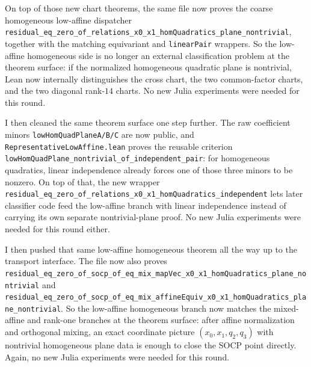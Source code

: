 \documentclass[11pt]{article}
\begin{document}
On top of those new chart theorems, the same file now proves the coarse
homogeneous low-affine dispatcher
\texttt{residual\_eq\_zero\_of\_relations\_x0\_x1\_homQuadratics\_plane\_nontrivial},
together with the matching equivariant and \texttt{linearPair} wrappers. So the
low-affine homogeneous side is no longer an external classification problem at
the theorem surface: if the normalized homogeneous quadratic plane is nontrivial,
Lean now internally distinguishes the cross chart, the two common-factor
charts, and the two diagonal rank-\(14\) charts. No new Julia experiments were
needed for this round.

I then cleaned the same theorem surface one step further. The raw coefficient
minors \texttt{lowHomQuadPlaneA/B/C} are now public, and
\texttt{RepresentativeLowAffine.lean} proves the reusable criterion
\texttt{lowHomQuadPlane\_nontrivial\_of\_independent\_pair}: for homogeneous
quadratics, linear independence already forces one of those three minors to be
nonzero. On top of that, the new wrapper
\texttt{residual\_eq\_zero\_of\_relations\_x0\_x1\_homQuadratics\_independent}
lets later classifier code feed the low-affine branch with linear independence
instead of carrying its own separate nontrivial-plane proof. No new Julia
experiments were needed for this round either.

I then pushed that same low-affine homogeneous theorem all the way up to the
transport interface. The file now also proves
\texttt{residual\_eq\_zero\_of\_socp\_of\_eq\_mix\_mapVec\_x0\_x1\_homQuadratics\_plane\_nontrivial}
and
\texttt{residual\_eq\_zero\_of\_socp\_of\_eq\_mix\_affineEquiv\_x0\_x1\_homQuadratics\_plane\_nontrivial}.
So the low-affine homogeneous branch now matches the mixed-affine and rank-one
branches at the theorem surface: after affine normalization and orthogonal
mixing, an exact coordinate picture \((x_0,x_1,q_2,q_3)\) with nontrivial
homogeneous plane data is enough to close the SOCP point directly. Again, no
new Julia experiments were needed for this round.
\end{document}
